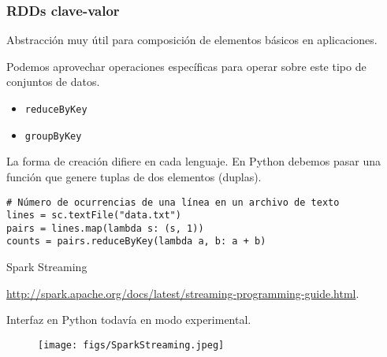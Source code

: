 
\begin{frame}[fragile]
 \frametitle{RDDs clave-valor}
 
 \begin{wideitemize}

   \item Abstracción muy útil para composición de elementos básicos en aplicaciones.
   
   \item Podemos aprovechar operaciones específicas para operar sobre este tipo
   de conjuntos de datos.
   \begin{itemize}
    \item \texttt{reduceByKey}
    \item \texttt{groupByKey}
   \end{itemize}

   \item La forma de creación difiere en cada lenguaje. En Python debemos pasar
   una función que genere tuplas de dos elementos (duplas).

    \end{wideitemize}
  \fontsize{8pt}{12pt}\selectfont
  \begin{verbatim}
# Número de ocurrencias de una línea en un archivo de texto
lines = sc.textFile("data.txt")
pairs = lines.map(lambda s: (s, 1))
counts = pairs.reduceByKey(lambda a, b: a + b)
  \end{verbatim}

\end{frame}


\begin{frame}{Spark Streaming}
\begin{wideitemize}
 \item \url{http://spark.apache.org/docs/latest/streaming-programming-guide.html}.
 
 \item Interfaz en Python todavía en modo experimental.
\end{wideitemize}


\begin{figure}
 \centering
 \texttt{[image: figs/SparkStreaming.jpeg]}
\end{figure}

\end{frame}



